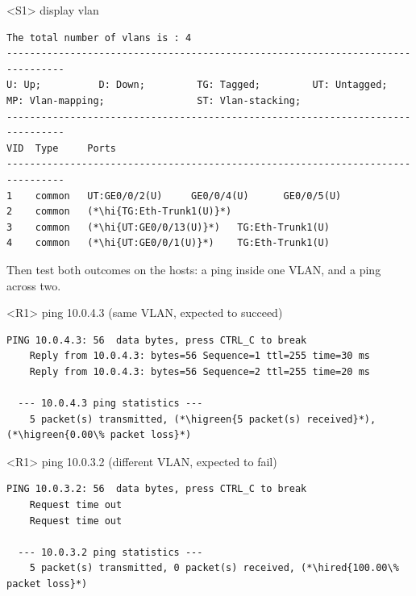 \begin{vrpbox}{<S1> display vlan}
\begin{lstlisting}[style=dcnvrp]
The total number of vlans is : 4
--------------------------------------------------------------------------------
U: Up;          D: Down;         TG: Tagged;         UT: Untagged;
MP: Vlan-mapping;                ST: Vlan-stacking;
--------------------------------------------------------------------------------
VID  Type     Ports
--------------------------------------------------------------------------------
1    common   UT:GE0/0/2(U)     GE0/0/4(U)      GE0/0/5(U)
2    common   (*\hi{TG:Eth-Trunk1(U)}*)
3    common   (*\hi{UT:GE0/0/13(U)}*)   TG:Eth-Trunk1(U)
4    common   (*\hi{UT:GE0/0/1(U)}*)    TG:Eth-Trunk1(U)
\end{lstlisting}
\end{vrpbox}

Then test both outcomes on the hosts: a ping inside one VLAN, and a ping
across two.

\begin{vrpbox}{<R1> ping 10.0.4.3 \quad (same VLAN, expected to succeed)}
\begin{lstlisting}[style=dcnvrp]
  PING 10.0.4.3: 56  data bytes, press CTRL_C to break
    Reply from 10.0.4.3: bytes=56 Sequence=1 ttl=255 time=30 ms
    Reply from 10.0.4.3: bytes=56 Sequence=2 ttl=255 time=20 ms

  --- 10.0.4.3 ping statistics ---
    5 packet(s) transmitted, (*\higreen{5 packet(s) received}*), (*\higreen{0.00\% packet loss}*)
\end{lstlisting}
\end{vrpbox}

\begin{vrpbox}{<R1> ping 10.0.3.2 \quad (different VLAN, expected to fail)}
\begin{lstlisting}[style=dcnvrp]
  PING 10.0.3.2: 56  data bytes, press CTRL_C to break
    Request time out
    Request time out

  --- 10.0.3.2 ping statistics ---
    5 packet(s) transmitted, 0 packet(s) received, (*\hired{100.00\% packet loss}*)
\end{lstlisting}
\end{vrpbox}

